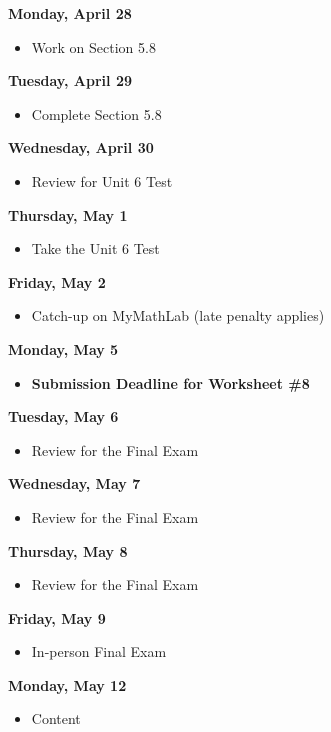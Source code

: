 \documentclass[11pt]{article}
\begin{document}
\textbf{Monday, April 28}

\begin{itemize}
\item Work on Section 5.8
\end{itemize}

\textbf{Tuesday, April 29}

\begin{itemize}
\item Complete Section 5.8
\end{itemize}

\textbf{Wednesday, April 30}

\begin{itemize}
\item Review for Unit 6 Test
\end{itemize}

\textbf{Thursday, May 1}

\begin{itemize}
\item Take the Unit 6 Test
\end{itemize}

\textbf{Friday, May 2}

\begin{itemize}
\item Catch-up on MyMathLab (late penalty applies)
\end{itemize}

\textbf{Monday, May 5}

\begin{itemize}
\item \textbf{Submission Deadline for Worksheet \#8}
\end{itemize}

\textbf{Tuesday, May 6}

\begin{itemize}
\item Review for the Final Exam
\end{itemize}

\textbf{Wednesday, May 7}

\begin{itemize}
\item Review for the Final Exam
\end{itemize}

\textbf{Thursday, May 8}

\begin{itemize}
\item Review for the Final Exam
\end{itemize}

\textbf{Friday, May 9}

\begin{itemize}
\item In-person Final Exam
\end{itemize}

\textbf{Monday, May 12}

\begin{itemize}
\item Content
\end{itemize}
\end{document}
